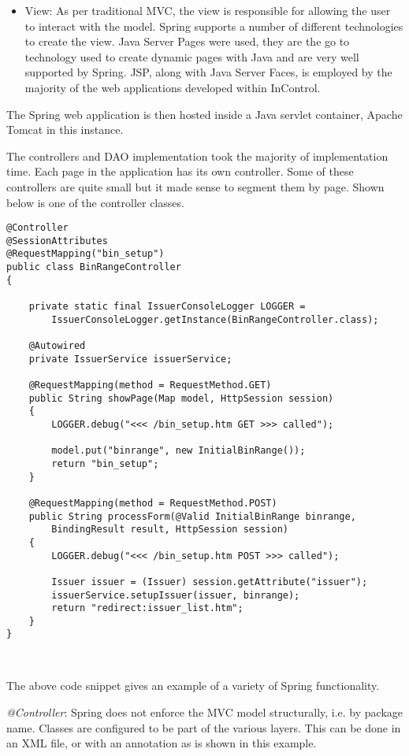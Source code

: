 \documentclass[a4paper, 11pt, titlepage]{article}
\begin{document}
\begin{itemize}
\item View: As per traditional MVC, the view is responsible for allowing the user to interact with the model. Spring supports a number of different technologies to create the view. Java Server Pages were used, they are the go to technology used to create dynamic pages with Java and are very well supported by Spring. JSP, along with Java Server Faces, is employed by the majority of the web applications developed within InControl. 
\end{itemize} 
 
The Spring web application is then hosted inside a Java servlet container, Apache Tomcat in this instance. 
 
The controllers and DAO implementation took the majority of implementation time. Each page in the application has its own controller. Some of these controllers are quite small but it made sense to segment them by page. Shown below is one of the controller classes.
 
\begin{verbatim} 
@Controller 
@SessionAttributes 
@RequestMapping("bin_setup") 
public class BinRangeController 
{ 
 
    private static final IssuerConsoleLogger LOGGER = 
        IssuerConsoleLogger.getInstance(BinRangeController.class); 
 
    @Autowired 
    private IssuerService issuerService; 
 
    @RequestMapping(method = RequestMethod.GET) 
    public String showPage(Map model, HttpSession session) 
    { 
        LOGGER.debug("<<< /bin_setup.htm GET >>> called"); 
 
        model.put("binrange", new InitialBinRange()); 
        return "bin_setup"; 
    } 
 
    @RequestMapping(method = RequestMethod.POST) 
    public String processForm(@Valid InitialBinRange binrange, 
        BindingResult result, HttpSession session) 
    { 
        LOGGER.debug("<<< /bin_setup.htm POST >>> called"); 
 
        Issuer issuer = (Issuer) session.getAttribute("issuer"); 
        issuerService.setupIssuer(issuer, binrange); 
        return "redirect:issuer_list.htm"; 
    } 
} 
 
 
\end{verbatim} 
 
The above code snippet gives an example of a variety of Spring functionality.  
 
\textit{@Controller}: Spring does not enforce the MVC model structurally, i.e. by package name. Classes are configured to be part of the various layers. This can be done in an XML file, or with an annotation as is shown in this example.  
 
\end{document}
